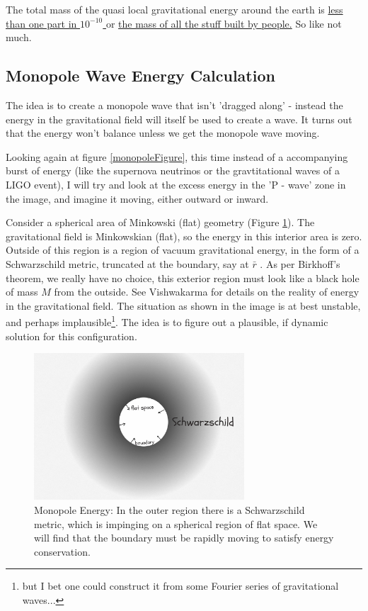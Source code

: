 \documentclass[../rzero]{subfiles}
\begin{document}
The total mass of the quasi local gravitational energy around the earth is  \href{https://www.wolframalpha.com/input?i=%28G*%28mass+of+earth%29%5E2%2F%28c%5E2%2812000km%29%29%29%2F%28mass+of+earth%29}{less than one part in $10^{-10}$ } or \href{https://www.wolframalpha.com/input?i=G*%28mass+of+earth%29%5E2%2F%28c%5E2%2812000km%29%29}{the mass of all the stuff built by people.} So like not much.

\subsection{Monopole Wave Energy Calculation }
The idea is to create a monopole wave that isn't 'dragged along' - instead the energy in the gravitational field will itself be used to create a wave. It turns out that the energy won't balance unless we get the monopole wave moving.

Looking again at figure \ref{monopoleFigure}, this time instead of a accompanying burst of energy (like the supernova neutrinos or the gravtitational waves of a LIGO event), I will try and look at the excess energy in the 'P - wave' zone in the image, and imagine it moving, either outward or inward. 

Consider a spherical area of Minkowski (flat) geometry (Figure \ref{monopoleEnergy}). The gravitational field is Minkowskian (flat), so the energy in this interior area is zero. Outside of this region is a region of vacuum gravitational energy, in the form of a Schwarzschild metric, truncated at the boundary, say at $\bar r$ . As per Birkhoff's theorem, we really have no choice, this exterior region must look like a black hole of mass $M$ from the outside. See Vishwakarma\cite{vishwakarmaMysteriesRikNovel2014}\cite{vishwakarmaEinsteinCriticalPerspective2016} for details on the reality of energy in the gravitational field. The situation as shown in the image is at best unstable, and perhaps implausible\footnote{but I bet one could construct it from some Fourier series of gravitational waves...}. The idea is to figure out a plausible, if dynamic solution for this configuration. 


\begin{figure}\label{monopoleEnergy}
\includegraphics[width=0.7\textwidth]{chapters/images/monopole-energy.jpg}
\caption{Monopole Energy: In the outer region there is a Schwarzschild metric, which is impinging on a spherical region of flat space. We will find that the boundary must be rapidly moving to satisfy energy conservation.}
\end{figure}
\end{document}
